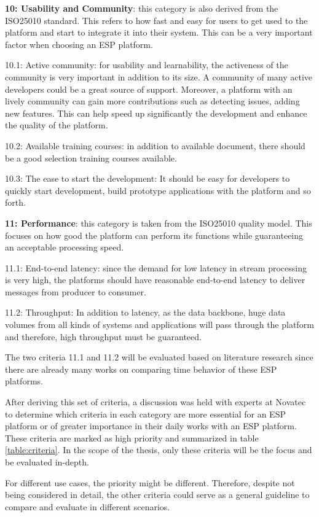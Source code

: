 \textbf{10: Usability and Community}: this category is also derived from the ISO25010 standard. This refers to how fast and easy for users to get used to the platform and start to integrate it into their system. This can be a very important factor when choosing an ESP platform. 

10.1: Active community: for usability and learnability, the activeness of the community is very important in addition to its size. A community of many active developers could be a great source of support. Moreover, a platform with an lively community can gain more contributions such as detecting issues, adding new features. This can help speed up significantly the development and enhance the quality of the platform.

10.2: Available training courses: in addition to available document, there should be a good selection training courses available. 

10.3: The ease to start the development: It should be easy for developers to quickly start development, build prototype applications with the platform and so forth.

\textbf{11: Performance}: this category is taken from the ISO25010 quality model. This focuses on how good the platform can perform its functions while guaranteeing an acceptable processing speed. 

11.1: End-to-end latency: since the demand for low latency in stream processing is very high, the platforms should have reasonable end-to-end latency to deliver messages from producer to consumer. 

11.2: Throughput: In addition to latency, as the data backbone, huge data volumes from all kinds of systems and applications will pass through the platform and therefore, high throughput must be guaranteed.

The two criteria 11.1 and 11.2 will be evaluated based on literature research since there are already many works on comparing time behavior of these ESP platforms.

After deriving this set of criteria, a discussion was held with experts at Novatec to determine which criteria in each category are more essential for an ESP platform or of greater importance in their daily works with an ESP platform. These criteria are marked as high priority and summarized in table \ref{table:criteria}. In the scope of the thesis, only these criteria will be the focus and be evaluated in-depth. 

For different use cases, the priority might be different. Therefore, despite not being considered in detail, the other criteria could serve as a general guideline to compare and evaluate in different scenarios. 

